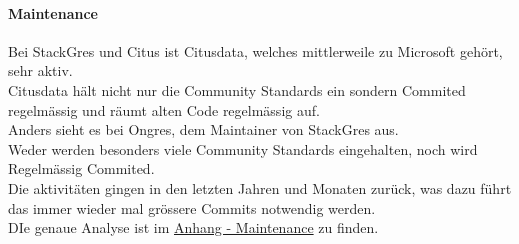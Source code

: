 \begin{flushleft}
    \paragraph{Maintenance}
    Bei StackGres und Citus ist Citusdata, welches mittlerweile zu Microsoft gehört, sehr aktiv.\\
    Citusdata hält nicht nur die Community Standards ein sondern Commited regelmässig und räumt alten Code regelmässig auf.\\
    Anders sieht es bei Ongres, dem Maintainer von StackGres aus.\\
    Weder werden besonders viele Community Standards eingehalten, noch wird Regelmässig Commited.\\
    Die aktivitäten gingen in den letzten Jahren und Monaten zurück, was dazu führt das immer wieder mal grössere Commits notwendig werden.\\
    DIe genaue Analyse ist im \hyperref[subsec:maintenance_stackgres_citus]{Anhang - Maintenance} zu finden.
\end{flushleft}
